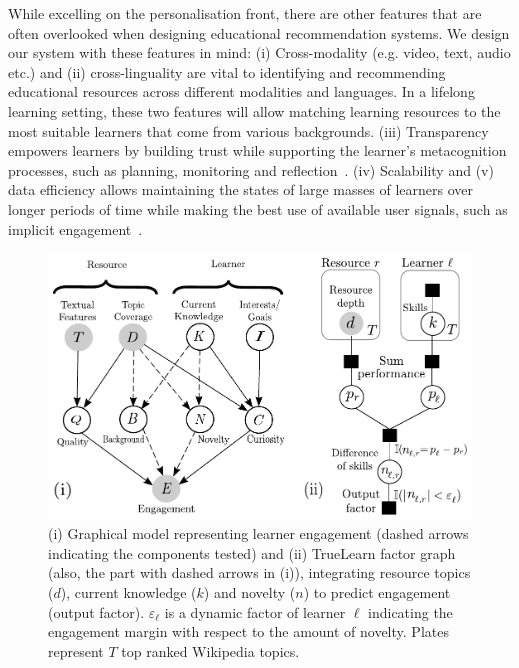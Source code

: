 \documentclass[letterpaper]{article} %
\begin{document}
While excelling on the personalisation front, there are other features that are often overlooked when designing educational recommendation systems. We design our system with these features in mind:
(i) {Cross-modality} (e.g. video, text, audio etc.) and (ii) {cross-linguality} are vital to identifying and recommending educational resources across different modalities and languages. In a lifelong learning setting, these two features will allow matching learning resources to the most suitable learners that come from various backgrounds. (iii) {Transparency} empowers learners by building trust while supporting the learner's metacognition processes, such as planning, monitoring and reflection~\cite{Bull2016}. (iv) {Scalability} and (v) {data efficiency} allows maintaining the states of large masses of learners over longer periods of time while making the best use of available user signals, such as implicit engagement~\cite{Salehi2014}.






































\begin{figure}[!tbp]
 \centering
 \includegraphics[width=\columnwidth]{./engagement_model_truelearn_model_v3.pdf}
 \caption{(i) Graphical model representing learner engagement (dashed arrows indicating the components tested) and (ii) TrueLearn factor graph (also, the part with dashed arrows in (i)), integrating resource topics ($d$), current knowledge ($k$) and novelty ($n$) to predict engagement (output factor). $\varepsilon_\ell$ is a dynamic factor of learner $\ell$ indicating the engagement margin with respect to the amount of novelty. Plates represent $T$ top ranked Wikipedia topics.}
 \label{fig:learner_model}
\end{figure}
\end{document}
